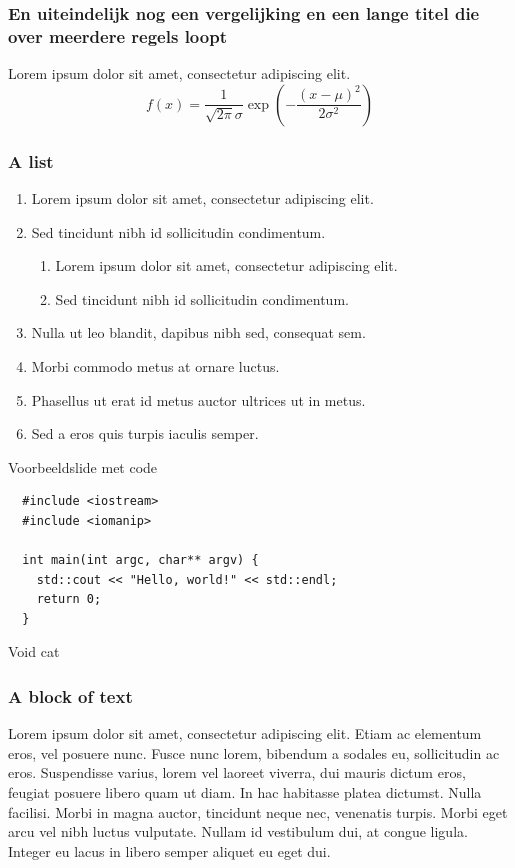 \documentclass[aspectratio=1610]{beamer}
\begin{document}
\invert

\begin{frame}
  \frametitle{En uiteindelijk nog een vergelijking en een lange titel die over meerdere regels loopt}
  Lorem ipsum dolor sit amet, consectetur adipiscing elit.
  \begin{equation}
    f(x) = \frac{1}{\sqrt{2\pi}\sigma}\exp\left(-\frac{(x - \mu)^2}{2\sigma^2}\right)
  \end{equation}
\end{frame}


\begin{frame}
  \frametitle{A list}
  \begin{enumerate}
    \item Lorem ipsum dolor sit amet, consectetur adipiscing elit.
    \item Sed tincidunt nibh id sollicitudin condimentum.
    \begin{enumerate}
      \item Lorem ipsum dolor sit amet, consectetur adipiscing elit.
      \item Sed tincidunt nibh id sollicitudin condimentum.
    \end{enumerate}
    \item Nulla ut leo blandit, dapibus nibh sed, consequat sem.
    \item Morbi commodo metus at ornare luctus.
    \item Phasellus ut erat id metus auctor ultrices ut in metus.
    \item Sed a eros quis turpis iaculis semper.
  \end{enumerate}
\end{frame}
\revert

\begin{frame}[fragile]{Voorbeeldslide met code}
  \begin{verbatim}
  #include <iostream>
  #include <iomanip>

  int main(int argc, char** argv) {
    std::cout << "Hello, world!" << std::endl;
    return 0;
  }
  \end{verbatim}
\end{frame}

\begin{frame}{Void cat}
  \centering
\end{frame}


\invert
\begin{frame}
  \frametitle{A block of text}
  Lorem ipsum dolor sit amet, consectetur adipiscing elit. Etiam ac elementum
  eros, vel posuere nunc. Fusce nunc lorem, bibendum a sodales eu, sollicitudin
  ac eros. Suspendisse varius, lorem vel laoreet viverra, dui mauris dictum
  eros, feugiat posuere libero quam ut diam. In hac habitasse platea dictumst.
  Nulla facilisi. Morbi in magna auctor, tincidunt neque nec, venenatis turpis.
  Morbi eget arcu vel nibh luctus vulputate. Nullam id vestibulum dui, at congue
  ligula. Integer eu lacus in libero semper aliquet eu eget dui.
\end{frame}

\revert

\begin{frame}[plain]
\end{frame}
\end{document}
